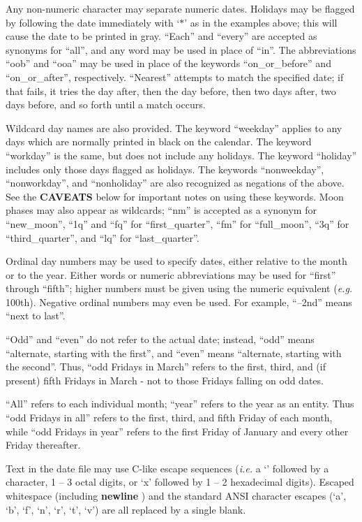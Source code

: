 Any non-numeric character may separate numeric dates.  Holidays may be
flagged by following the date immediately with `$\ast$' as in the
examples above; this will cause the date to be printed in gray.  ``Each''
and ``every'' are accepted as synonyms for ``all'', and any word may be
used in place of ``in''.  The abbreviations ``oob'' and ``ooa'' may be
used in place of the keywords ``on\_or\_before'' and ``on\_or\_after'',
respectively.  ``Nearest'' attempts to match the specified date; if that
fails, it tries the day after, then the day before, then two days after,
two days before, and so forth until a match occurs.

Wildcard day names are also provided.  The keyword ``weekday'' applies to
any days which are normally printed in black on the calendar.  The
keyword ``workday'' is the same, but does not include any holidays.  The
keyword ``holiday'' includes only those days flagged as holidays.  The
keywords ``nonweekday'', ``nonworkday'', and ``nonholiday'' are also
recognized as negations of the above.  See the {\bf CAVEATS} below for
important notes on using these keywords. Moon phases may also appear as
wildcards; ``nm'' is accepted as a synonym for ``new\_moon'', ``1q'' and
``fq'' for ``first\_quarter'', ``fm'' for ``full\_moon'', ``3q'' for
``third\_quarter'', and ``lq'' for ``last\_quarter''.

Ordinal day numbers may be used to specify dates, either relative to the
month or to the year.  Either words or numeric abbreviations may be used
for ``first'' through ``fifth''; higher numbers must be given using the
numeric equivalent ({\it e.g.} 100th).  Negative ordinal numbers may even be
used.  For example, ``--2nd'' means ``next to last''.

``Odd'' and ``even'' do not refer to the actual date; instead, ``odd''
means ``alternate, starting with the first'', and ``even'' means
``alternate, starting with the second''.  Thus, ``odd Fridays in March''
refers to the first, third, and (if present) fifth Fridays in March - not
to those Fridays falling on odd dates.

``All'' refers to each individual month; ``year'' refers to the year as
an entity.  Thus ``odd Fridays in all'' refers to the first, third, and
fifth Friday of each month, while ``odd Fridays in year'' refers to the
first Friday of January and every other Friday thereafter.

Text in the date file may use C-like escape sequences ({\it i.e.} a `\bs '
followed by a character, 1 -- 3 octal digits, or `x' followed by 1 -- 2
hexadecimal digits).  Escaped whitespace (including {\bf newline} ) and
the standard ANSI character escapes (`\bs a', `\bs b', `\bs f', `\bs n',
`\bs r', `\bs t', `\bs v') are all replaced by a single blank.

